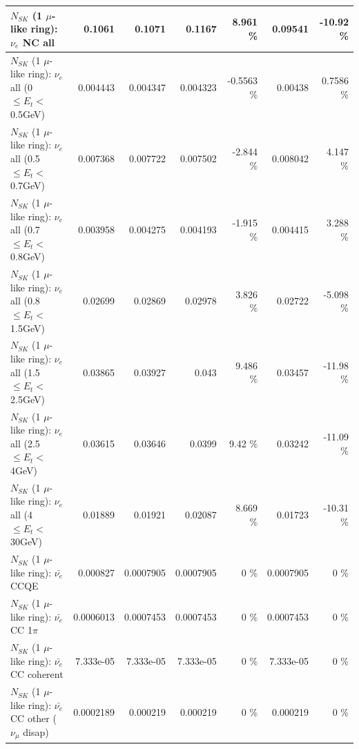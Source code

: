 \begin{table}
\begin{tabular}{| l | r | r | r  r | r  r |}
                                  $N_{SK}$ (1 $\mu$-like ring): $\nu_{e}$ NC all &          0.1061 &          0.1071 &          0.1167 &    8.961 \%  &         0.09541 &   -10.92 \%  \\ 
\hline
           $N_{SK}$ (1 $\mu$-like ring): $\nu_{e}$ all (0 $\leq E_{t} <$ 0.5GeV) &        0.004443 &        0.004347 &        0.004323 &  -0.5563 \%  &         0.00438 &   0.7586 \%  \\ 
         $N_{SK}$ (1 $\mu$-like ring): $\nu_{e}$ all (0.5 $\leq E_{t} <$ 0.7GeV) &        0.007368 &        0.007722 &        0.007502 &   -2.844 \%  &        0.008042 &    4.147 \%  \\ 
         $N_{SK}$ (1 $\mu$-like ring): $\nu_{e}$ all (0.7 $\leq E_{t} <$ 0.8GeV) &        0.003958 &        0.004275 &        0.004193 &   -1.915 \%  &        0.004415 &    3.288 \%  \\ 
         $N_{SK}$ (1 $\mu$-like ring): $\nu_{e}$ all (0.8 $\leq E_{t} <$ 1.5GeV) &         0.02699 &         0.02869 &         0.02978 &    3.826 \%  &         0.02722 &   -5.098 \%  \\ 
         $N_{SK}$ (1 $\mu$-like ring): $\nu_{e}$ all (1.5 $\leq E_{t} <$ 2.5GeV) &         0.03865 &         0.03927 &           0.043 &    9.486 \%  &         0.03457 &   -11.98 \%  \\ 
           $N_{SK}$ (1 $\mu$-like ring): $\nu_{e}$ all (2.5 $\leq E_{t} <$ 4GeV) &         0.03615 &         0.03646 &          0.0399 &     9.42 \%  &         0.03242 &   -11.09 \%  \\ 
            $N_{SK}$ (1 $\mu$-like ring): $\nu_{e}$ all (4 $\leq E_{t} <$ 30GeV) &         0.01889 &         0.01921 &         0.02087 &    8.669 \%  &         0.01723 &   -10.31 \%  \\ 
\hline
\hline
\hline
                                $N_{SK}$ (1 $\mu$-like ring): $\bar{\nu_e}$ CCQE &        0.000827 &       0.0007905 &       0.0007905 &        0 \%  &       0.0007905 &        0 \%  \\ 
                           $N_{SK}$ (1 $\mu$-like ring): $\bar{\nu_e}$ CC 1$\pi$ &       0.0006013 &       0.0007453 &       0.0007453 &        0 \%  &       0.0007453 &        0 \%  \\ 
                         $N_{SK}$ (1 $\mu$-like ring): $\bar{\nu_e}$ CC coherent &       7.333e-05 &       7.333e-05 &       7.333e-05 &        0 \%  &       7.333e-05 &        0 \%  \\ 
          $N_{SK}$ (1 $\mu$-like ring): $\bar{\nu_e}$ CC other ($\nu_\mu$ disap) &       0.0002189 &        0.000219 &        0.000219 &        0 \%  &        0.000219 &        0 \%  \\ 

\end{tabular}
\end{table}
